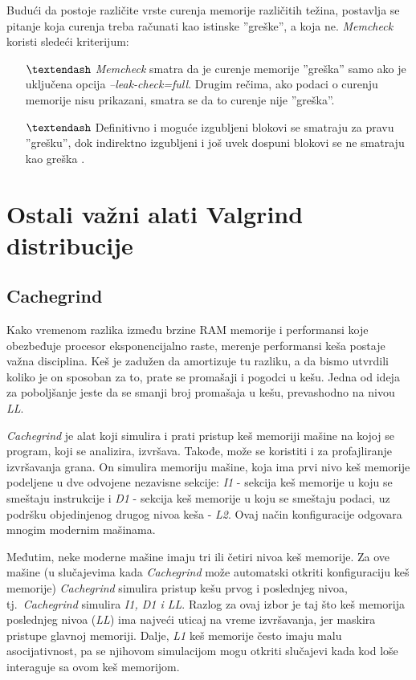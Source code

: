 \documentclass[12pt,oneside]{memoir}
\theoremstyle{plain}
\theoremstyle{definition}
\begin{document}
Budući da postoje različite vrste curenja memorije različitih težina, postavlja se pitanje koja curenja treba računati kao istinske ''greške'', a koja ne. \textit{Memcheck} koristi sledeći kriterijum:
\begin{itemize}
\item[$\textendash$] \textit{Memcheck} smatra da je curenje memorije ''greška'' samo ako je uključena opcija \textit{--leak-check=full}. Drugim rečima, ako podaci o curenju memorije nisu prikazani, smatra se da to curenje nije ''greška''.
\item[$\textendash$] Definitivno i moguće izgubljeni blokovi se smatraju za pravu ''grešku'', dok indirektno izgubljeni i još uvek dospuni blokovi se ne smatraju kao greška \cite{Memcheck}. 
\end{itemize}

\section{Ostali važni alati Valgrind distribucije}
\subsection{Cachegrind}
Kako vremenom razlika između brzine RAM memorije i performansi koje obezbeđuje procesor eksponencijalno raste, merenje performansi keša postaje važna disciplina. Keš je zadužen da amortizuje tu razliku, a da bismo utvrdili koliko je on sposoban za to, prate se promašaji i pogodci u kešu. Jedna od  ideja za poboljšanje jeste da se smanji broj promašaja u kešu, prevashodno na nivou \textit{LL}.

\textit{Cachegrind} je alat koji simulira i prati pristup keš memoriji mašine na kojoj se program, koji se analizira, izvršava. Takođe, može se koristiti i za profajliranje izvršavanja grana. On simulira memoriju mašine, koja ima prvi nivo keš memorije podeljene u dve odvojene nezavisne sekcije: \textit{I1} - sekcija keš memorije u koju se smeštaju instrukcije i \textit{D1} - sekcija keš memorije u koju se smeštaju podaci, uz podršku objedinjenog drugog nivoa keša - \textit{L2}. Ovaj način konfiguracije odgovara mnogim modernim mašinama.


Međutim, neke moderne mašine imaju tri ili četiri nivoa keš memorije. Za ove mašine (u slučajevima kada \textit{Cachegrind} može automatski otkriti konfiguraciju keš memorije) \textit{Cachegrind} simulira pristup kešu prvog i poslednjeg nivoa, tj.~\textit{Cachegrind} simulira \textit{I1, D1 i LL}. Razlog za ovaj izbor je taj što keš memorija poslednjeg nivoa (\textit{LL}) ima najveći uticaj na vreme izvršavanja, jer maskira pristupe glavnoj memoriji. Dalje, \textit{L1} keš memorije često imaju malu asocijativnost, pa se njihovom simulacijom mogu otkriti slučajevi kada kod loše interaguje sa ovom keš memorijom.
\end{document}
